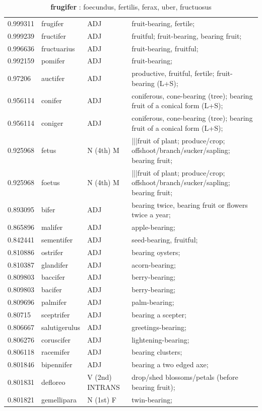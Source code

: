 \documentclass[]{article}
\begin{document}
	\begin{table}
	\caption{\textbf{frugifer} : foecundus, fertilis, ferax, uber, fructuosus \label{frugifer}}
	\vspace{.25in}
	\begin{tabular}{l|lll}
	   0.999311 & frugifer & ADJ & fruit-bearing, fertile;\\
	   0.999239 & fructifer & ADJ & fruitful; fruit-bearing, bearing fruit;\\
	   0.996636 & fructuarius & ADJ & fruit-bearing, fruitful;\\
	   0.992159 & pomifer & ADJ & fruit-bearing;\\
	   0.97206 & auctifer & ADJ & productive, fruitful, fertile; fruit-bearing (L+S);\\
	   0.956114 & conifer & ADJ & coniferous, cone-bearing (tree); bearing fruit of a conical form (L+S);\\
	   0.956114 & coniger & ADJ & coniferous, cone-bearing (tree); bearing fruit of a conical form (L+S);\\
	   0.925968 & fetus & N (4th) M & |||fruit of plant; produce/crop; offshoot/branch/sucker/sapling; bearing fruit;\\
	   0.925968 & foetus & N (4th) M & |||fruit of plant; produce/crop; offshoot/branch/sucker/sapling; bearing fruit;\\
	   0.893095 & bifer & ADJ & bearing twice, bearing fruit or flowers twice a year;\\
	   0.865896 & malifer & ADJ & apple-bearing;\\
	   0.842441 & sementifer & ADJ & seed-bearing, fruitful;\\
	   0.810886 & ostrifer & ADJ & bearing oysters;\\
	   0.810387 & glandifer & ADJ & acorn-bearing;\\
	   0.809803 & baccifer & ADJ & berry-bearing;\\
	   0.809803 & bacifer & ADJ & berry-bearing;\\
	   0.809696 & palmifer & ADJ & palm-bearing;\\
	   0.80715 & sceptrifer & ADJ & bearing a scepter;\\
	   0.806667 & salutigerulus & ADJ & greetings-bearing;\\
	   0.806276 & coruscifer & ADJ & lightening-bearing;\\
	   0.806118 & racemifer & ADJ & bearing clusters;\\
	   0.801846 & bipennifer & ADJ & bearing a two edged axe;\\
	   0.801831 & defloreo & V (2nd) INTRANS & drop/shed blossoms/petals (before bearing fruit);\\
	   0.801821 & gemellipara & N (1st) F & twin-bearing;\\
	\end{tabular}
	\end{table}
\end{document}
